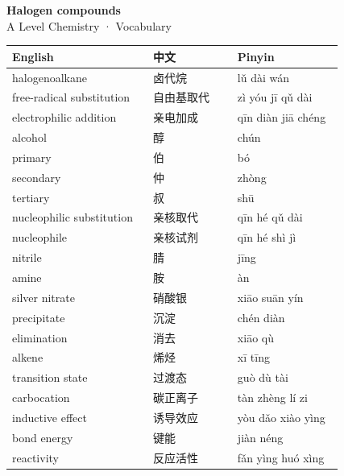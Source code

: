 \documentclass[11pt]{article}
\begin{document}
\begin{center}
  {\LARGE\bfseries Halogen compounds}\\[0.35em]
  {\large A Level Chemistry · Vocabulary}
\end{center}
\vspace{0.6em}

\begin{longtable}{@{}p{0.40\linewidth}p{0.24\linewidth}p{0.30\linewidth}@{}}
\toprule
\textbf{English} & \textbf{中文} & \textbf{Pinyin} \\
\midrule
\endhead
\bottomrule
\endlastfoot
halogenoalkane & 卤代烷 & lǔ dài wán \\
free-radical substitution & 自由基取代 & zì yóu jī qǔ dài \\
electrophilic addition & 亲电加成 & qīn diàn jiā chéng \\
alcohol & 醇 & chún \\
primary & 伯 & bó \\
secondary & 仲 & zhòng \\
tertiary & 叔 & shū \\
nucleophilic substitution & 亲核取代 & qīn hé qǔ dài \\
nucleophile & 亲核试剂 & qīn hé shì jì \\
nitrile & 腈 & jīng \\
amine & 胺 & àn \\
silver nitrate & 硝酸银 & xiāo suān yín \\
precipitate & 沉淀 & chén diàn \\
elimination & 消去 & xiāo qù \\
alkene & 烯烃 & xī tīng \\
transition state & 过渡态 & guò dù tài \\
carbocation & 碳正离子 & tàn zhèng lí zi \\
inductive effect & 诱导效应 & yòu dǎo xiào yìng \\
bond energy & 键能 & jiàn néng \\
reactivity & 反应活性 & fǎn yìng huó xìng \\
\end{longtable}
\end{document}
